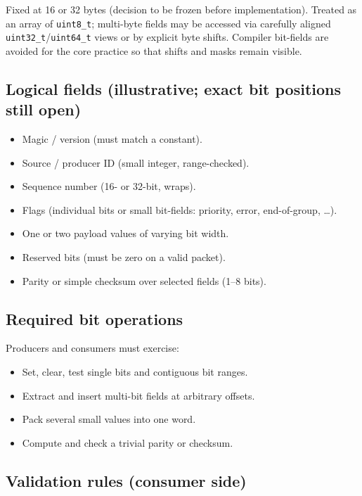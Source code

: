 \documentclass[11pt,a4paper]{article}
\begin{document}
Fixed at 16 or 32 bytes (decision to be frozen before implementation).  
Treated as an array of \texttt{uint8\_t}; multi-byte fields may be accessed via carefully aligned \texttt{uint32\_t}/\texttt{uint64\_t} views or by explicit byte shifts. Compiler bit-fields are avoided for the core practice so that shifts and masks remain visible.

\subsection{Logical fields (illustrative; exact bit positions still open)}

\begin{itemize}[leftmargin=*]
    \item Magic / version (must match a constant).
    \item Source / producer ID (small integer, range-checked).
    \item Sequence number (16- or 32-bit, wraps).
    \item Flags (individual bits or small bit-fields: priority, error, end-of-group, \ldots).
    \item One or two payload values of varying bit width.
    \item Reserved bits (must be zero on a valid packet).
    \item Parity or simple checksum over selected fields (1--8 bits).
\end{itemize}

\subsection{Required bit operations}

Producers and consumers must exercise:
\begin{itemize}[leftmargin=*]
    \item Set, clear, test single bits and contiguous bit ranges.
    \item Extract and insert multi-bit fields at arbitrary offsets.
    \item Pack several small values into one word.
    \item Compute and check a trivial parity or checksum.
\end{itemize}

\subsection{Validation rules (consumer side)}
\end{document}
